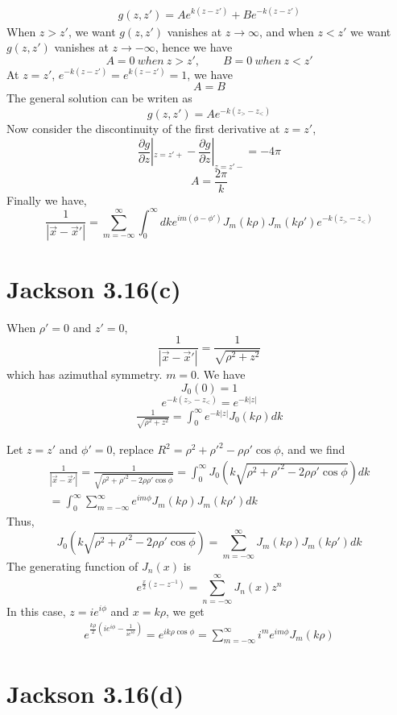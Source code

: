 \documentclass{article}
\newcommand{\pd}[2]{\frac{\partial#1}{\partial#2}}
\begin{document}
\begin{align*}
  g(z,z')= Ae^{k(z-z')}+Be^{-k(z-z')}
\end{align*}
When $z>z'$, we want $g(z,z')$ vanishes at $z\rightarrow\infty$, and when $z<z'$ we want $g(z,z')$ vanishes at $z\rightarrow -\infty$, hence we have
\[ A=0\ when\ z>z',\qquad B=0\ when\ z<z' \]
At $z=z'$, $e^{-k(z-z')}=e^{k(z-z')}=1$, we have
\[ A=B \]
The general solution can be writen as
\[ g(z,z')=Ae^{-k(z_>-z_<)} \]
Now consider the discontinuity of the first derivative at $z=z'$,
\[ \pd{g}{z}|_{z=z'+}-\pd{g}{z}|_{z=z'-}=-4\pi \]
\[ A=\frac{2\pi}{k} \]
Finally we have,
\[ \boxed{\frac{1}{|\vec x-\vec x'|}=\sum_{m=-\infty}^{\infty}\int_0^{\infty}dk e^{im(\phi-\phi')}J_m(k\rho)J_m(k\rho')e^{-k(z_>-z_<)}} \]\par
\pagebreak

\section*{Jackson 3.16(c)}

When $\rho'=0$ and $z'=0$,
\[ \frac{1}{|\vec x-\vec x'|}=\frac{1}{\sqrt{\rho^2+z^2}} \]
which has azimuthal symmetry. $m=0$.
We have
\[ J_0(0)=1 \]
\[e^{-k(z_>-z_<)}=e^{-k|z|} \]
\begin{align*}
  \frac{1}{\sqrt{\rho^2+z^2}}=\int_0^{\infty} e^{-k|z|}J_0(k\rho)dk
\end{align*}\par
Let $z=z'$ and $\phi'=0$, replace $R^2=\rho^2+\rho'^2-\rho\rho'\cos\phi$, and we find
\begin{align*}
  \frac{1}{|\vec x-\vec x'|}=\frac{1}{\sqrt{\rho^2+\rho'^2-2\rho\rho'\cos\phi}}=\int_0^\infty J_0(k\sqrt{\rho^2+\rho'^2-2\rho\rho'\cos\phi}) dk\\
  =\int_0^\infty\sum_{m=-\infty}^{\infty}e^{im\phi}J_m(k\rho)J_m(k\rho')dk
\end{align*}
Thus,
\[ J_0(k\sqrt{\rho^2+\rho'^2-2\rho\rho'\cos\phi})=\sum_{m=-\infty}^{\infty}J_m(k\rho)J_m(k\rho')dk\]
The generating function of $J_n(x)$ is
\[ e^{\frac x2(z-z^{-1})}=\sum_{n=-\infty}^{\infty}J_n(x)z^n \]
In this case, $z=ie^{i\phi}$ and $x=k\rho$, we get
\begin{align*}
  e^{\frac{k\rho}{2}(ie^{i\phi}-\frac{1}{ie^{i\phi}})}=e^{ik\rho\cos\phi}=\sum_{m=-\infty}^{\infty}i^m e^{im\phi} J_m(k\rho)
\end{align*}
\pagebreak

\section*{Jackson 3.16(d)}
\end{document}

